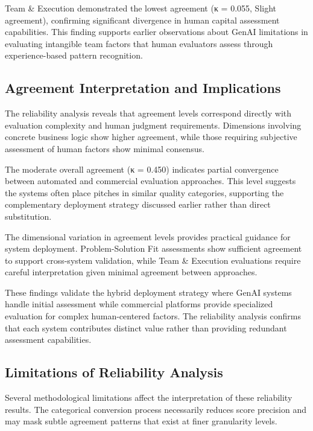 Team \& Execution demonstrated the lowest agreement (κ = 0.055, Slight agreement), confirming significant divergence in human capital assessment capabilities. This finding supports earlier observations about GenAI limitations in evaluating intangible team factors that human evaluators assess through experience-based pattern recognition.

\subsection{Agreement Interpretation and Implications}
\label{subsec:agreement-implications}

The reliability analysis reveals that agreement levels correspond directly with evaluation complexity and human judgment requirements. Dimensions involving concrete business logic show higher agreement, while those requiring subjective assessment of human factors show minimal consensus.

The moderate overall agreement (κ = 0.450) indicates partial convergence between automated and commercial evaluation approaches. This level suggests the systems often place pitches in similar quality categories, supporting the complementary deployment strategy discussed earlier rather than direct substitution.

The dimensional variation in agreement levels provides practical guidance for system deployment. Problem-Solution Fit assessments show sufficient agreement to support cross-system validation, while Team \& Execution evaluations require careful interpretation given minimal agreement between approaches.

These findings validate the hybrid deployment strategy where GenAI systems handle initial assessment while commercial platforms provide specialized evaluation for complex human-centered factors. The reliability analysis confirms that each system contributes distinct value rather than providing redundant assessment capabilities.

\subsection{Limitations of Reliability Analysis}
\label{subsec:reliability-limitations}

Several methodological limitations affect the interpretation of these reliability results. The categorical conversion process necessarily reduces score precision and may mask subtle agreement patterns that exist at finer granularity levels.

